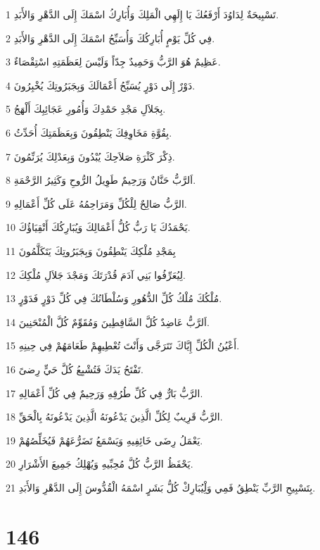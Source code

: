 \par 1 تَسْبِيحَةٌ لِدَاوُدَ أَرْفَعُكَ يَا إِلَهِي الْمَلِكَ وَأُبَارِكُ اسْمَكَ إِلَى الدَّهْرِ وَالأَبَدِ.
\par 2 فِي كُلِّ يَوْمٍ أُبَارِكُكَ وَأُسَبِّحُ اسْمَكَ إِلَى الدَّهْرِ وَالأَبَدِ.
\par 3 عَظِيمٌ هُوَ الرَّبُّ وَحَمِيدٌ جِدّاً وَلَيْسَ لِعَظَمَتِهِ اسْتِقْصَاءٌ.
\par 4 دَوْرٌ إِلَى دَوْرٍ يُسَبِّحُ أَعْمَالَكَ وَبِجَبَرُوتِكَ يُخْبِرُونَ.
\par 5 بِجَلاَلِ مَجْدِ حَمْدِكَ وَأُمُورِ عَجَائِبِكَ أَلْهَجُ.
\par 6 بِقُوَّةِ مَخَاوِفِكَ يَنْطِقُونَ وَبِعَظَمَتِكَ أُحَدِّثُ.
\par 7 ذِكْرَ كَثْرَةِ صَلاَحِكَ يُبْدُونَ وَبِعَدْلِكَ يُرَنِّمُونَ.
\par 8 اَلرَّبُّ حَنَّانٌ وَرَحِيمٌ طَوِيلُ الرُّوحِ وَكَثِيرُ الرَّحْمَةِ.
\par 9 الرَّبُّ صَالِحٌ لِلْكُلِّ وَمَرَاحِمُهُ عَلَى كُلِّ أَعْمَالِهِ.
\par 10 يَحْمَدُكَ يَا رَبُّ كُلُّ أَعْمَالِكَ وَيُبَارِكُكَ أَتْقِيَاؤُكَ.
\par 11 بِمَجْدِ مُلْكِكَ يَنْطِقُونَ وَبِجَبَرُوتِكَ يَتَكَلَّمُونَ
\par 12 لِيُعَرِّفُوا بَنِي آدَمَ قُدْرَتَكَ وَمَجْدَ جَلاَلِ مُلْكِكَ.
\par 13 مُلْكُكَ مُلْكُ كُلِّ الدُّهُورِ وَسُلْطَانُكَ فِي كُلِّ دَوْرٍ فَدَوْرٍ.
\par 14 اَلرَّبُّ عَاضِدٌ كُلَّ السَّاقِطِينَ وَمُقَوِّمٌ كُلَّ الْمُنْحَنِينَ.
\par 15 أَعْيُنُ الْكُلِّ إِيَّاكَ تَتَرَجَّى وَأَنْتَ تُعْطِيهِمْ طَعَامَهُمْ فِي حِينِهِ.
\par 16 تَفْتَحُ يَدَكَ فَتُشْبِعُ كُلَّ حَيٍّ رِضىً.
\par 17 الرَّبُّ بَارٌّ فِي كُلِّ طُرُقِهِ وَرَحِيمٌ فِي كُلِّ أَعْمَالِهِ.
\par 18 الرَّبُّ قَرِيبٌ لِكُلِّ الَّذِينَ يَدْعُونَهُ الَّذِينَ يَدْعُونَهُ بِالْحَقِّ.
\par 19 يَعْمَلُ رِضَى خَائِفِيهِ وَيَسْمَعُ تَضَرُّعَهُمْ فَيُخَلِّصُهُمْ.
\par 20 يَحْفَظُ الرَّبُّ كُلَّ مُحِبِّيهِ وَيُهْلِكُ جَمِيعَ الأَشْرَارِ.
\par 21 بِتَسْبِيحِ الرَّبِّ يَنْطِقُ فَمِي وَلِْيُبَارِكْ كُلُّ بَشَرٍ اسْمَهُ الْقُدُّوسَ إِلَى الدَّهْرِ وَالأَبَدِ.

\chapter{146}

